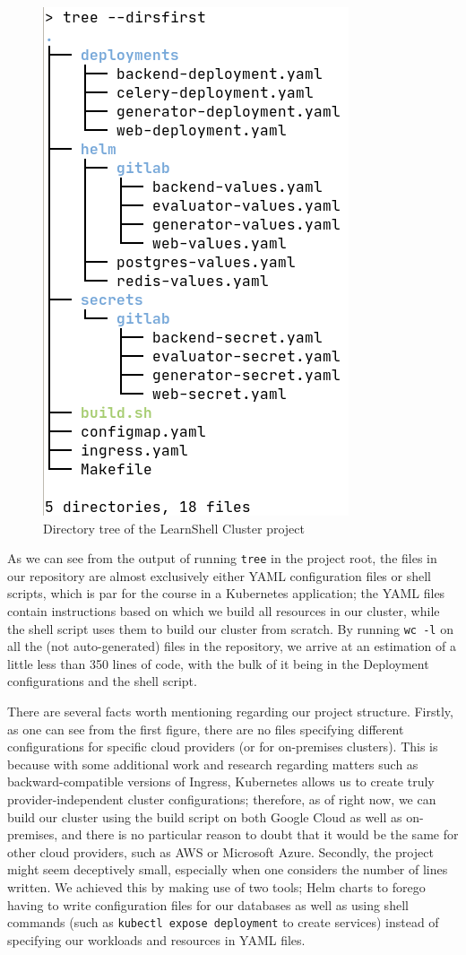 \documentclass[thesis=B,english]{FITthesis}[2019/12/23]
\begin{document}
\begin{figure}[H]
\caption{Directory tree of the LearnShell Cluster project}
\includegraphics[scale=0.5]{tree}
\end{figure}


As we can see from the output of running \verb|tree| in the project root, the files in our repository are almost exclusively either YAML configuration files or shell scripts, which is par for the course in a Kubernetes application; the YAML files contain instructions based on which we build all resources in our cluster, while the shell script uses them to build our cluster from scratch. By running \verb|wc -l| on all the (not auto-generated) files in the repository, we arrive at an estimation of a little less than 350 lines of code, with the bulk of it being in the Deployment configurations and the shell script.

There are several facts worth mentioning regarding our project structure. Firstly, as one can see from the first figure, there are no files specifying different configurations for specific cloud providers (or for on-premises clusters). This is because with some additional work and research regarding matters such as backward-compatible versions of Ingress, Kubernetes allows us to create truly provider-independent cluster configurations; therefore, as of right now, we can build our cluster using the build script on both Google Cloud as well as on-premises, and there is no particular reason to doubt that it would be the same for other cloud providers, such as AWS or Microsoft Azure. Secondly, the project might seem deceptively small, especially when one considers the number of lines written. We achieved this by making use of two tools; Helm charts to forego having to write configuration files for our databases as well as using shell commands (such as \verb|kubectl expose deployment| to create services) instead of specifying our workloads and resources in YAML files. 
\end{document}

